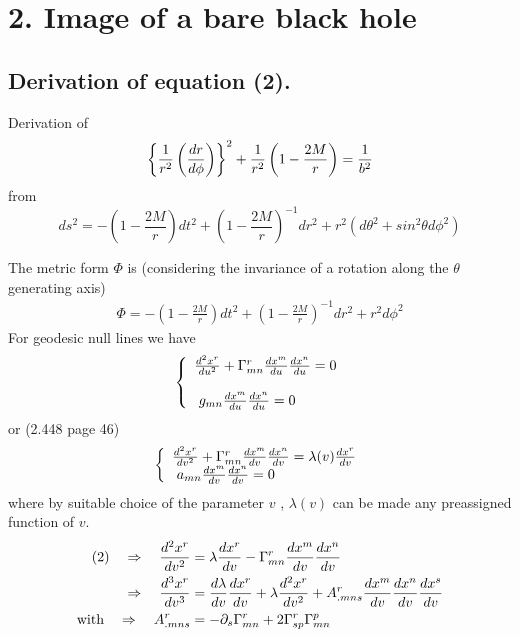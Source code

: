\setcounter{chapter}{1}
\chapter{2. Image of a bare black hole}
\pagebreak[4]
\setcounter{section}{0}
\section{Derivation of equation (2).}
\begin{tcolorbox}
Derivation of 
$$\left\{\frac{1}{r^2}\left(\dv{r}{\phi}\right)\right\}^2 + \frac{1}{r^2}\left(1-\frac{2M}{r}\right)=\frac{1}{b^2}$$ from 
$$ds^2=-\left(1-\frac{2M}{r}\right)dt^2 +\left(1-\frac{2M}{r}\right)^{-1}dr^2+r^2\left(d\theta^2+sin^2\theta d\phi^2\right)$$
\end{tcolorbox}
The metric form $\Phi$ is (considering the invariance of a rotation along the  $\theta$ generating axis)
\begin{align}
\Phi = -\left(1-\frac{2M}{r}\right)dt^2 +\left(1-\frac{2M}{r}\right)^{-1}dr^2+r^2d\phi^2
\end{align}
For geodesic null lines we have 
\begin{align}
\left \{ \begin{array}{l}
\dv[2]{x^r}{u} + \Gamma^r_{mn}\dv{x^m}{u}\dv{x^n}{u} = 0\\\\
\ g_{mn}\dv{x^m}{u}\dv{x^n}{u} = 0
\end{array}\right.
\end{align}
or (2.448 page 46)
\begin{align}
\left \{ \begin{array}{l}
\dv[2]{x^r}{v} + \Gamma^r_{mn}\dv{x^m}{v}\dv{x^n}{v} = \lambda(v) \dv{x^r}{v}\\
\ a_{mn}\dv{x^m}{v}\dv{x^n}{v} = 0
\end{array}\right.
\end{align}
where by suitable choice of the parameter $v$ , $\lambda(v) $ can be made any preassigned function of $v$.
\begin{align}
\text{(2)} \quad\Rightarrow\quad \dv[2]{x^r}{v} &=   \lambda \dv{x^r}{v}-\Gamma^r_{mn}\dv{x^m}{v}\dv{x^n}{v} \\
\quad\Rightarrow\quad \dv[3]{x^r}{v} &=   \dv{\lambda }{v}\dv{x^r}{v}+ \lambda \dv[2]{x^r}{v}+ A^r_{.mns}\dv{x^m}{v}\dv{x^n}{v}\dv{x^s}{v} \\
\text{with}\quad\Rightarrow\quad A^r_{.mns} &= - \partial_s \Gamma^r_{mn} + 2 \Gamma^r_{sp}\Gamma^p_{mn}
\end{align}
